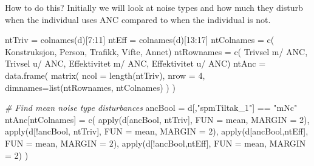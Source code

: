 \documentclass[
]{article}
\newenvironment{Shaded}{\begin{snugshade}}{\end{snugshade}}
\newcommand{\AttributeTok}[1]{\textcolor[rgb]{0.77,0.63,0.00}{#1}}
\newcommand{\CommentTok}[1]{\textcolor[rgb]{0.56,0.35,0.01}{\textit{#1}}}
\newcommand{\DecValTok}[1]{\textcolor[rgb]{0.00,0.00,0.81}{#1}}
\newcommand{\FunctionTok}[1]{\textcolor[rgb]{0.00,0.00,0.00}{#1}}
\newcommand{\NormalTok}[1]{#1}
\newcommand{\OtherTok}[1]{\textcolor[rgb]{0.56,0.35,0.01}{#1}}
\newcommand{\SpecialCharTok}[1]{\textcolor[rgb]{0.00,0.00,0.00}{#1}}
\newcommand{\StringTok}[1]{\textcolor[rgb]{0.31,0.60,0.02}{#1}}
\begin{document}
How to do this?
Initially we will look at noise types and how much they disturb when the individual uses ANC compared to when the individual is not.

\begin{Shaded}
\begin{Highlighting}[]
\NormalTok{ntTriv }\OtherTok{=} \FunctionTok{colnames}\NormalTok{(d)[}\DecValTok{7}\SpecialCharTok{:}\DecValTok{11}\NormalTok{]}
\NormalTok{ntEff }\OtherTok{=} \FunctionTok{colnames}\NormalTok{(d)[}\DecValTok{13}\SpecialCharTok{:}\DecValTok{17}\NormalTok{]}
\NormalTok{ntColnames }\OtherTok{=} \FunctionTok{c}\NormalTok{(}
  \StringTok{\textquotesingle{}Konstruksjon\textquotesingle{}}\NormalTok{, }\StringTok{\textquotesingle{}Person\textquotesingle{}}\NormalTok{, }\StringTok{\textquotesingle{}Trafikk\textquotesingle{}}\NormalTok{, }\StringTok{\textquotesingle{}Vifte\textquotesingle{}}\NormalTok{, }\StringTok{\textquotesingle{}Annet\textquotesingle{}}\NormalTok{)}
\NormalTok{ntRownames }\OtherTok{=} \FunctionTok{c}\NormalTok{(}
  \StringTok{\textquotesingle{}Trivsel m/ ANC\textquotesingle{}}\NormalTok{, }\StringTok{\textquotesingle{}Trivsel u/ ANC\textquotesingle{}}\NormalTok{, }\StringTok{\textquotesingle{}Effektivitet m/ ANC\textquotesingle{}}\NormalTok{,}
  \StringTok{\textquotesingle{}Effektivitet u/ ANC\textquotesingle{}}\NormalTok{)}
\NormalTok{ntAnc }\OtherTok{=} \FunctionTok{data.frame}\NormalTok{(}
  \FunctionTok{matrix}\NormalTok{(}
    \AttributeTok{ncol =} \FunctionTok{length}\NormalTok{(ntTriv), }\AttributeTok{nrow =} \DecValTok{4}\NormalTok{,}
    \AttributeTok{dimnames=}\FunctionTok{list}\NormalTok{(ntRownames, ntColnames)}
\NormalTok{  )}
\NormalTok{)}

\CommentTok{\# Find mean noise type disturbances}
\NormalTok{ancBool }\OtherTok{=}\NormalTok{ d[,}\StringTok{"spmTiltak\_1"}\NormalTok{] }\SpecialCharTok{==} \StringTok{"mNc"}
\NormalTok{ntAnc[ntColnames] }\OtherTok{=} \FunctionTok{c}\NormalTok{(}
  \FunctionTok{apply}\NormalTok{(d[ancBool, ntTriv], }\AttributeTok{FUN =}\NormalTok{ mean, }\AttributeTok{MARGIN =} \DecValTok{2}\NormalTok{),}
  \FunctionTok{apply}\NormalTok{(d[}\SpecialCharTok{!}\NormalTok{ancBool, ntTriv], }\AttributeTok{FUN =}\NormalTok{ mean, }\AttributeTok{MARGIN =} \DecValTok{2}\NormalTok{),}
  \FunctionTok{apply}\NormalTok{(d[ancBool,ntEff], }\AttributeTok{FUN =}\NormalTok{ mean, }\AttributeTok{MARGIN =} \DecValTok{2}\NormalTok{),}
  \FunctionTok{apply}\NormalTok{(d[}\SpecialCharTok{!}\NormalTok{ancBool,ntEff], }\AttributeTok{FUN =}\NormalTok{ mean, }\AttributeTok{MARGIN =} \DecValTok{2}\NormalTok{)}
\NormalTok{)}


\end{Highlighting}
\end{Shaded}
\end{document}
